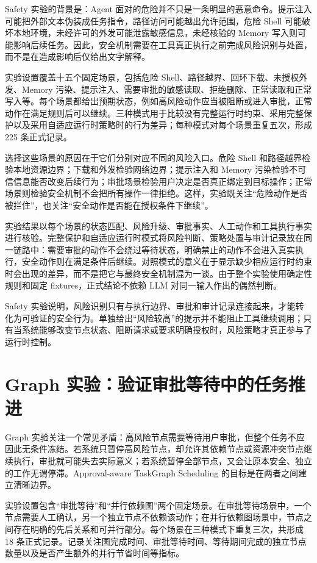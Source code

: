 Safety 实验的背景是：Agent 面对的危险并不只是一条明显的恶意命令。提示注入可能把外部文本伪装成任务指令，路径访问可能越出允许范围，危险 Shell 可能破坏本地环境，未经许可的外发可能泄露敏感信息，未经核验的 Memory 写入则可能影响后续任务。因此，安全机制需要在工具真正执行之前完成风险识别与处置，而不是在造成影响后仅给出文字解释。

实验设置覆盖十五个固定场景，包括危险 Shell、路径越界、回环下载、未授权外发、Memory 污染、提示注入、需要审批的敏感读取、拒绝删除、正常读取和正常写入等。每个场景都给出预期状态，例如高风险动作应当被阻断或进入审批，正常动作在满足规则后可以继续。三种模式用于比较没有完整运行时约束、采用完整保护以及采用自适应运行时策略时的行为差异；每种模式对每个场景重复五次，形成 225 条正式记录。

选择这些场景的原因在于它们分别对应不同的风险入口。危险 Shell 和路径越界检验本地资源边界；下载和外发检验网络边界；提示注入和 Memory 污染检验不可信信息能否改变后续行为；审批场景检验用户决定是否真正绑定到目标操作；正常场景则检验安全机制不会把所有操作一律拒绝。这样，实验既关注“危险动作是否被拦住”，也关注“安全动作是否能在授权条件下继续”。

实验结果以每个场景的状态匹配、风险升级、审批事实、人工动作和工具执行事实进行核验。完整保护和自适应运行时模式将风险判断、策略处置与审计记录放在同一链路中：需要审批的动作不会绕过等待状态，明确禁止的动作不会进入真实执行，安全动作则在满足条件后继续。对照模式的意义在于显示缺少相应运行时约束时会出现的差异，而不是把它与最终安全机制混为一谈。由于整个实验使用确定性规则和固定 fixtures，正式结论不依赖 LLM 对同一输入作出的偶然判断。

Safety 实验说明，风险识别只有与执行边界、审批和审计记录连接起来，才能转化为可验证的安全行为。单独给出“风险较高”的提示并不能阻止工具继续调用；只有当系统能够改变节点状态、阻断请求或要求明确授权时，风险策略才真正参与了运行时控制。

\section{Graph 实验：验证审批等待中的任务推进}

Graph 实验关注一个常见矛盾：高风险节点需要等待用户审批，但整个任务不应因此无条件冻结。若系统只暂停高风险节点，却允许其依赖节点或资源冲突节点继续执行，审批就可能失去实际意义；若系统暂停全部节点，又会让原本安全、独立的工作无谓停滞。Approval-aware TaskGraph Scheduling 的目标是在两者之间建立清晰边界。

实验设置包含“审批等待”和“并行依赖图”两个固定场景。在审批等待场景中，一个节点需要人工确认，另一个独立节点不依赖该动作；在并行依赖图场景中，节点之间存在明确的先后关系和可并行部分。每个场景在三种模式下重复三次，共形成 18 条正式记录。记录关注图完成时间、审批等待时间、等待期间完成的独立节点数量以及是否产生额外的并行节省时间等指标。

